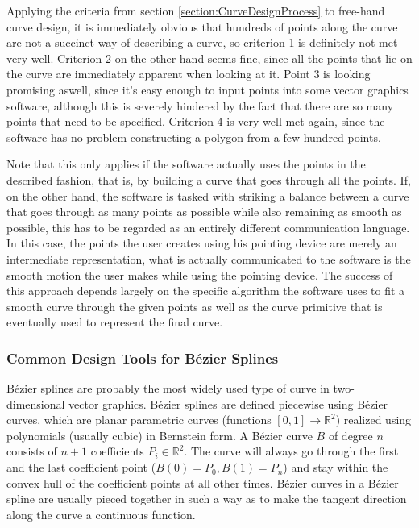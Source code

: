 \documentclass[a4paper]{article}
\begin{document}
				Applying the criteria from section \ref{section:CurveDesignProcess} to free-hand curve design, it is immediately obvious that hundreds of points along the curve are not a succinct way of describing a curve, so criterion 1 is definitely not met very well. Criterion 2 on the other hand seems fine, since all the points that lie on the curve are immediately apparent when looking at it. Point 3 is looking promising aswell, since it's easy enough to input points into some vector graphics software, although this is severely hindered by the fact that there are so many points that need to be specified. Criterion 4 is very well met again, since the software has no problem constructing a polygon from a few hundred points.

				Note that this only applies if the software actually uses the points in the described fashion, that is, by building a curve that goes through all the points. If, on the other hand, the software is tasked with striking a balance between a curve that goes through as many points as possible while also remaining as smooth as possible, this has to be regarded as an entirely different communication language. In this case, the points the user creates using his pointing device are merely an intermediate representation, what is actually communicated to the software is the smooth motion the user makes while using the pointing device. The success of this approach depends largely on the specific algorithm the software uses to fit a smooth curve through the given points as well as the curve primitive that is eventually used to represent the final curve.

			\subsubsection{Common Design Tools for Bézier Splines}

				Bézier splines are probably the most widely used type of curve in two-dimensional vector graphics. Bézier splines are defined piecewise using Bézier curves, which are planar parametric curves (functions \(\left[0,1\right] \rightarrow \mathbb{R}^2\)) realized using polynomials (usually cubic) in Bernstein form. A Bézier curve \(B\) of degree \(n\) consists of \(n + 1\) coefficients \(P_i \in \mathbb{R}^2\). The curve will always go through the first and the last coefficient point (\(B\left(0\right) = P_0, B\left(1\right) = P_n\)) and stay within the convex hull of the coefficient points at all other times. Bézier curves in a Bézier spline are usually pieced together in such a way as to make the tangent direction along the curve a continuous function.
\end{document}
